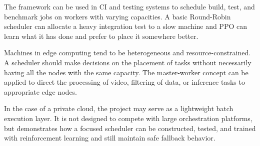 The framework can be used in CI and testing systems to schedule build, test, and benchmark jobs on workers with varying capacities. A basic Round-Robin scheduler can allocate a heavy integration test to a slow machine and PPO can learn what it has done and prefer to place it somewhere better.

Machines in edge computing tend to be heterogeneous and resource-constrained. A scheduler should make decisions on the placement of tasks without necessarily having all the nodes with the same capacity. The master-worker concept can be applied to direct the processing of video, filtering of data, or inference tasks to appropriate edge nodes.

In the case of a private cloud, the project may serve as a lightweight batch execution layer. It is not designed to compete with large orchestration platforms, but demonstrates how a focused scheduler can be constructed, tested, and trained with reinforcement learning and still maintain safe fallback behavior.
